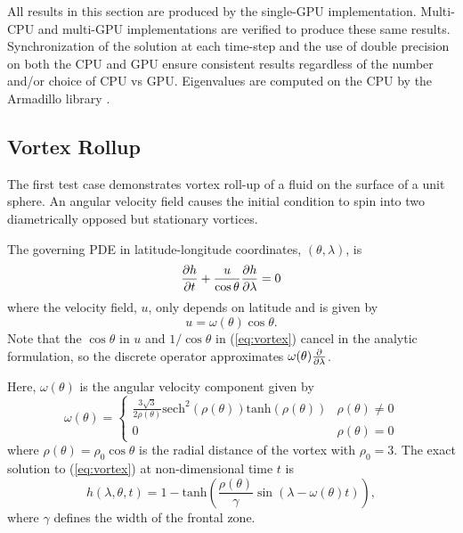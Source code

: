 \documentclass{report}
\begin{document}
All results in this section are produced by the single-GPU implementation. Multi-CPU and multi-GPU implementations are verified to produce these same results. Synchronization of the solution at each time-step and the use of double precision on both the CPU and GPU ensure consistent results regardless of the number and/or choice of CPU vs GPU. Eigenvalues are computed on the CPU by the Armadillo library \cite{armadillo2010}.

\subsection{Vortex Rollup}
\label{sec:numerical_validation}
The first test case demonstrates vortex roll-up of a fluid on the surface of a unit sphere. An angular velocity field causes the initial condition to spin into two diametrically opposed but stationary vortices.

The governing PDE in latitude-longitude coordinates, $(\theta,\lambda)$, is
\begin{equation}
\frac{\partial h}{\partial t} + \frac{u}{\cos \theta} \frac{\partial h}{\partial \lambda} = 0
\label{eq:vortex}
\end{equation}
where the velocity field, $u$, only depends on latitude and is given by
\begin{equation*}
u  = \omega(\theta) \cos \theta.
\end{equation*}
Note that the $\cos \theta$ in $u$ and $1/\cos{\theta}$ in (\ref{eq:vortex}) cancel in the analytic formulation, so the discrete operator approximates $\omega(\theta) \frac{\partial }{\partial \lambda}$. 

Here, $\omega(\theta)$ is the angular velocity component given by
\begin{equation*}
\omega(\theta) =
\begin{cases}
\frac{3\sqrt{3}}{2 \rho(\theta)} \mathrm{sech}^{2}(\rho(\theta)) \mathrm{tanh}(\rho(\theta)) & \rho(\theta) \neq 0 \\
0 & \rho(\theta) = 0
\end{cases}
\end{equation*}
where $\rho(\theta) = \rho_0 \cos \theta$ is the radial distance of the vortex with $\rho_0=3$. The exact solution to (\ref{eq:vortex}) at non-dimensional time $t$ is
\begin{equation*}
h(\lambda, \theta, t) = 1 - \mathrm{tanh}\left( \frac{\rho(\theta)}{\gamma} \sin(\lambda - \omega(\theta) t) \right),
\end{equation*}
where $\gamma$ defines the width of the frontal zone.
\end{document}

